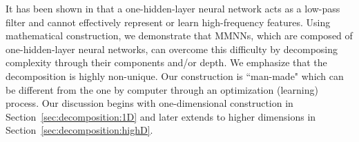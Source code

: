 \documentclass[review,hidelinks,onefignum,onetabnum]{siamart250211}
\begin{document}
It has been shown in \cite{ZZZZ-23} that a one-hidden-layer neural network acts as a low-pass filter and cannot effectively represent or learn high-frequency features. Using mathematical construction, we demonstrate that MMNNs, which are composed of one-hidden-layer neural networks, can overcome this difficulty by decomposing complexity through their components and/or depth.
We emphasize that the decomposition is highly non-unique. Our construction is ``man-made" which can be different from the one by computer through an optimization (learning) process.
Our discussion begins with one-dimensional construction in Section~\ref{sec:decomposition:1D} and later extends to higher dimensions in Section~\ref{sec:decomposition:highD}.




\end{document}
